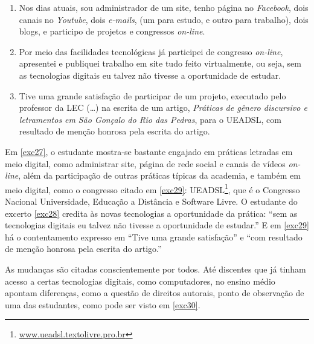 \documentclass{textolivre}
\begin{document}
\begin{enumerate}[resume,label={(\arabic*)},ref={\arabic*},topsep=1ex,partopsep=1ex]
\item\label{exc27} Nos dias atuais, sou administrador de um site, tenho página no \textit{Facebook}, dois canais no \textit{Youtube}, dois \textit{e-mails}, (um para estudo, e outro para trabalho), dois blogs, e participo de projetos e congressos \textit{on-line}.
\item\label{exc28} Por meio das facilidades tecnológicas já participei de congresso \textit{on-line}, apresentei e publiquei trabalho em site tudo feito virtualmente, ou seja, sem as tecnologias digitais eu talvez não tivesse a oportunidade de estudar.
\item\label{exc29} Tive uma grande satisfação de participar de um projeto, executado pelo professor da LEC (\ldots) na escrita de um artigo, \textit{Práticas de gênero discursivo e letramentos em} \textit{São Gonçalo do Rio das Pedras}, para o UEADSL, com resultado de menção honrosa pela escrita do artigo.
\end{enumerate}

Em \ref{exc27}, o estudante mostra-se bastante engajado em práticas letradas em meio digital, como administrar site, página de rede social e canais de vídeos \textit{on-line}, além da participação de outras práticas típicas da academia, e também em meio digital, como o congresso citado em \ref{exc29}: UEADSL\footnote{\url{www.ueadsl.textolivre.pro.br}}, que é o Congresso Nacional Universidade, Educação a Distância e Software Livre. O estudante do excerto \ref{exc28} credita às novas tecnologias a oportunidade da prática: “sem as tecnologias digitais eu talvez não tivesse a oportunidade de estudar.” E em \ref{exc29} há o contentamento expresso em “Tive uma grande satisfação” e “com resultado de menção honrosa pela escrita do artigo.”

As mudanças são citadas conscientemente por todos. Até discentes que já tinham acesso a certas tecnologias digitais, como computadores, no ensino médio apontam diferenças, como a questão de direitos autorais, ponto de observação de uma das estudantes, como pode ser visto em \ref{exc30}.

\end{document}
